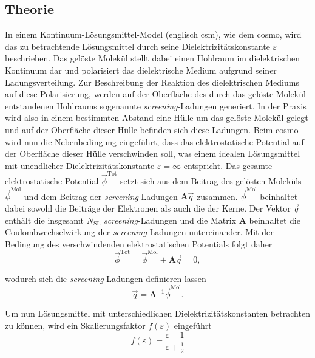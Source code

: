 	\subsection{Theorie}\label{kap:cosmotheo}
	In einem Kontinuum-Lösungsmittel-Model (englisch \ac{csm}), wie dem \ac{cosmo}, wird das zu betrachtende Lösungsmittel durch seine Dielektrizitätskonstante $\varepsilon$ beschrieben. Das gelöste Molekül stellt dabei einen Hohlraum im dielektrischen Kontinuum dar und polarisiert das dielektrische Medium aufgrund seiner Ladungsverteilung. Zur Beschreibung der Reaktion des dielektrischen Mediums auf diese Polarisierung, werden auf der Oberfläche des durch das gelöste Molekül entstandenen Hohlraums sogenannte \textit{screening}-Ladungen generiert. In der Praxis wird also in einem bestimmten Abstand eine Hülle um das gelöste Molekül gelegt und auf der Oberfläche dieser Hülle befinden sich diese Ladungen. Beim \ac{cosmo} wird nun die Nebenbedingung eingeführt, dass das elektrostatische Potential auf der Oberfläche dieser Hülle verschwinden soll, was einem idealen Lösungsmittel mit unendlicher Dielektrizitätskonstante $\varepsilon=\infty$ entspricht. Das gesamte elektrostatische Potential $\vec{\phi}^{\textrm{Tot}}$ setzt sich aus dem Beitrag des gelösten Moleküls $\vec{\phi}^{\textrm{Mol}}$ und dem Beitrag der \textit{screening}-Ladungen $\boldsymbol{A}\vec{q}$ zusammen. $\vec{\phi}^{\textrm{Mol}}$ beinhaltet dabei sowohl die Beiträge der Elektronen als auch die der Kerne. Der Vektor $\vec{q}$ enthält die insgesamt $N_{\textrm{SL}}$ \textit{screening}-Ladungen und die Matrix $\boldsymbol{A}$ beinhaltet die Coulombwechselwirkung der \textit{screening}-Ladungen untereinander. Mit der Bedingung des verschwindenden elektrostatischen Potentials folgt daher
	\begin{equation}
	\vec{\phi}^{\textrm{Tot}}=\vec{\phi}^{\textrm{Mol}}+\boldsymbol{A}\vec{q}=0,
	\end{equation}
	
wodurch sich die \textit{screening}-Ladungen definieren lassen
	\begin{equation}
	\vec{q}=\boldsymbol{A}^{-1}\vec{\phi}^{\textrm{Mol}}.
	\end{equation}
	
Um nun Lösungsmittel mit unterschiedlichen Dielektrizitätskonstanten betrachten zu können, wird ein Skalierungsfaktor $f(\varepsilon)$ eingeführt
	\begin{equation}
	f(\varepsilon)=\frac{\varepsilon-1}{\varepsilon+\frac{1}{2}}
	\end{equation}
	
